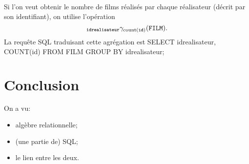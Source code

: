 \begin{exemple}
  Si l'on veut obtenir le nombre de films réalisés par chaque réalisateur (décrit par son identifiant), on utilise l'opération
  \begin{equation*}
    {}_{\mathtt{idrealisateur}}\gamma_{\mathrm{count}(\mathtt{id})}(\mathtt{FILM}).
  \end{equation*}
  La requête SQL traduisant cette agrégation est 
SELECT idrealisateur, COUNT(id)
FROM FILM
GROUP BY idrealisateur;
\end{exemple}


\section{Conclusion}

On a vu:
\begin{itemize}
\item algèbre relationnelle;
\item (une partie de) SQL;
\item le lien entre les deux.
\end{itemize}

